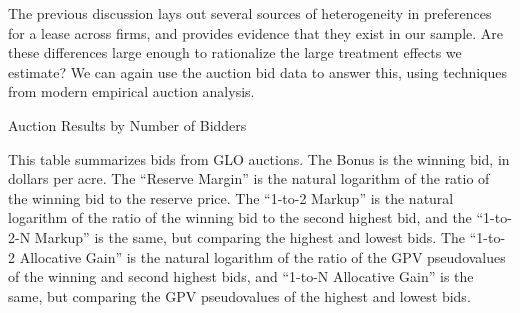 The previous discussion lays out several sources of heterogeneity in preferences for a lease across firms, and provides evidence that they exist in our sample.  Are these differences large enough to rationalize the large treatment effects we estimate? We can again use the auction bid data to answer this, using techniques from modern empirical auction analysis.

\addtolength{\tabcolsep}{-16pt}
\begin{table}[htpb]
\begin{center}
\begin{threeparttable}
	\caption{Auction Results by Number of Bidders}
	\label{tab:AuctionNBids}
 	\small
   	            
    \footnotesize
    \begin{tablenotes}
    	\item This table summarizes bids from GLO auctions. The Bonus is the winning bid, in dollars per acre.  The ``Reserve Margin'' is the natural logarithm of the ratio of the winning bid to the reserve price.  The ``1-to-2 Markup'' is the natural logarithm of the ratio of the winning bid to the second highest bid, and the ``1-to-2-N Markup'' is the same, but comparing the highest and lowest bids.  The ``1-to-2 Allocative Gain'' is the natural logarithm of the ratio of the GPV pseudovalues of the winning and second highest bids, and ``1-to-N Allocative Gain'' is the same, but comparing the GPV pseudovalues of the highest and lowest bids.
    \end{tablenotes}
\end{threeparttable}
\end{center}	
\end{table}
\addtolength{\tabcolsep}{-2pt}

